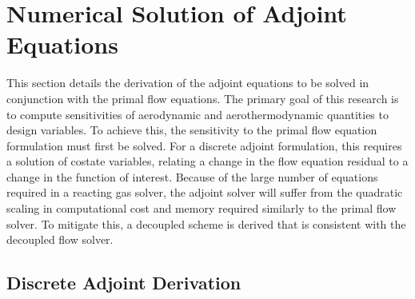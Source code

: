 \chapter{Numerical Solution of Adjoint Equations}
\label{chapter-four}

This section details the derivation of the adjoint equations to be solved in
conjunction with the primal flow equations.  The primary goal of this research is
to compute sensitivities of aerodynamic and aerothermodynamic quantities to
design variables.  To achieve this, the sensitivity to the primal flow equation
formulation must first be solved.  For a discrete adjoint formulation, this
requires a solution of costate variables, relating a change in the flow equation
residual to a change in the function of interest.  Because of the large number
of equations required in a reacting gas solver, the adjoint solver will suffer
from the quadratic scaling in computational cost and memory required similarly
to the primal flow solver.  To mitigate this, a decoupled scheme is derived that
is consistent with the decoupled flow solver.

\section{Discrete Adjoint Derivation}
\label{sec:adj-derivation}

